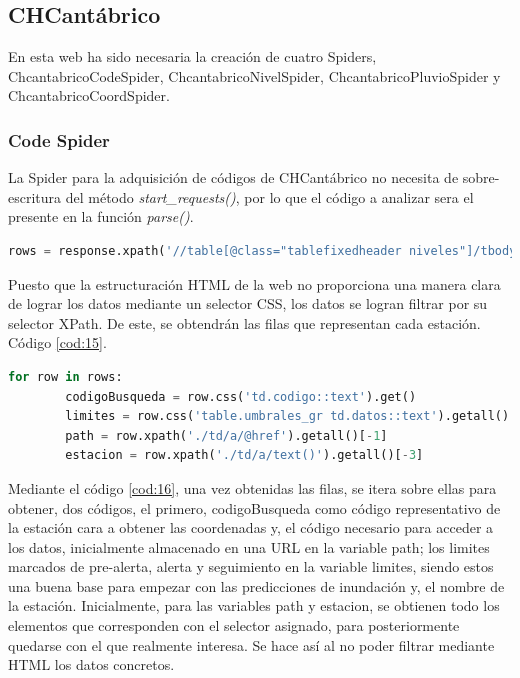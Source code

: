 \subsection{CHCantábrico}
En esta web ha sido necesaria la creación de cuatro Spiders, ChcantabricoCodeSpider, ChcantabricoNivelSpider, ChcantabricoPluvioSpider y ChcantabricoCoordSpider.

\subsubsection{Code Spider}
La Spider para la adquisición de códigos de CHCantábrico no necesita de sobre-escritura del método \textit{start\_requests()}, por lo que el código a analizar sera el presente en la función \textit{parse()}.

\begin{lstlisting}[language=Python, caption={Selector en \textit{parse()} de CHCantábrico Code Spider}, label=cod:15]
	rows = response.xpath('//table[@class="tablefixedheader niveles"]/tbody/tr')
\end{lstlisting}

Puesto que la estructuración HTML de la web no proporciona una manera clara de lograr los datos mediante un selector CSS, los datos se logran filtrar por su selector XPath. De este, se obtendrán las filas que representan cada estación. Código \ref{cod:15}.

\begin{lstlisting}[language=Python, caption={Trabajar sobre los datos de CHCantábrico Code Spider}, label=cod:16]
	for row in rows:
		codigoBusqueda = row.css('td.codigo::text').get()
		limites = row.css('table.umbrales_gr td.datos::text').getall()
		path = row.xpath('./td/a/@href').getall()[-1]
		estacion = row.xpath('./td/a/text()').getall()[-3]
\end{lstlisting}

Mediante el código \ref{cod:16}, una vez obtenidas las filas, se itera sobre ellas para obtener, dos códigos, el primero, codigoBusqueda como código representativo de la estación cara a obtener las coordenadas y, el código necesario para acceder a los datos, inicialmente almacenado en una URL en la variable path; los limites marcados de pre-alerta, alerta y seguimiento en la variable limites, siendo estos una buena base para empezar con las predicciones de inundación y, el nombre de la estación.\newline
\newline
Inicialmente, para las variables path y estacion, se obtienen todo los elementos que corresponden con el selector asignado, para posteriormente quedarse con el que realmente interesa. Se hace así al no poder filtrar mediante HTML los datos concretos.

